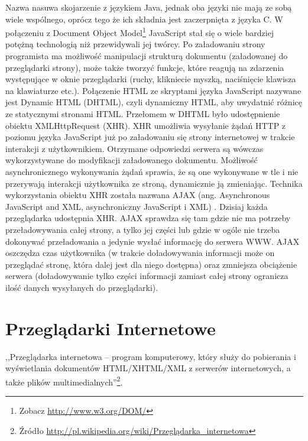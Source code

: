 \documentclass[a4paper,12pt,oneside]{report}
\begin{document}
Nazwa nasuwa skojarzenie z językiem Java, jednak oba języki nie mają ze sobą wiele wspólnego, oprócz tego że ich składnia jest zaczerpnięta z języka C. W połączeniu z Document Object Model\footnote{Zobacz \url{http://www.w3.org/DOM/}} JavaScript stał się o wiele bardziej potężną technologią niż przewidywali jej twórcy. Po załadowaniu strony programista ma możliwość manipulacji strukturą dokumentu (załadowanej do przeglądarki strony), może także tworzyć funkcje, które reagują na zdarzenia występujące w oknie przeglądarki (ruchy, klikniecie myszką, naciśnięcie klawisza na klawiaturze etc.). Połączenie HTML ze skryptami języka JavaScript nazywane jest Dynamic HTML (DHTML), czyli dynamiczny HTML, aby uwydatnić różnicę ze statycznymi stronami HTML. 
Przełomem w DHTML było udostępnienie obiektu XMLHttpRequest (XHR). XHR umożliwia wysyłanie żądań HTTP z poziomu języka JavaScript już po załadowaniu się strony internetowej w trakcie interakcji z użytkownikiem. Otrzymane odpowiedzi serwera są wówczas wykorzystywane do modyfikacji załadowanego dokumentu. Możliwość asynchronicznego wykonywania żądań sprawia, że są one wykonywane w tle i nie przerywają interakcji użytkownika ze stroną, dynamicznie ją zmieniając. Technika wykorzystania obiektu XHR została nazwana AJAX (ang. Asynchronous JavaScript and XML, asynchroniczny JavaScript i XML) . Dzisiaj każda przeglądarka udostępnia XHR. AJAX sprawdza się tam gdzie nie ma potrzeby przeładowywania całej strony, a tylko jej części lub gdzie w ogóle nie trzeba dokonywać przeładowania a jedynie wysłać informację do serwera WWW. AJAX oszczędza czas użytkownika (w trakcie doładowywania informacji może on przeglądać stronę, która dalej jest dla niego dostępna) oraz zmniejsza obciążenie serwera (doładowywanie tylko części informacji zamiast całej strony ogranicza ilość danych wysyłanych do przeglądarki). 

\section{Przeglądarki Internetowe}
\label{sec:przegladarki}

,,Przeglądarka internetowa – program komputerowy, który służy do pobierania i wyświetlania dokumentów HTML/XHTML/XML z serwerów internetowych, a także plików multimedialnych''\footnote{Źródło \url{http://pl.wikipedia.org/wiki/Przeglądarka\_internetowa}}.
\end{document}
